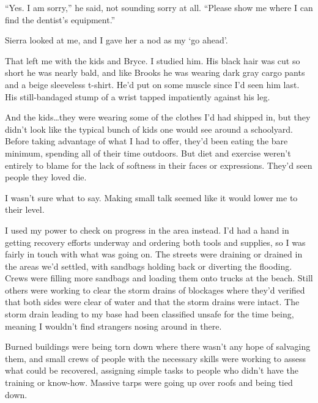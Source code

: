 ``Yes.  I am sorry,'' he said, not sounding sorry at all.  ``Please show me where I can find the dentist's equipment.''



Sierra looked at me, and I gave her a nod as my `go ahead'.



That left me with the kids and Bryce.  I studied him.  His black hair was cut so short he was nearly bald, and like Brooks he was wearing dark gray cargo pants and a beige sleeveless t-shirt.  He'd put on some muscle since I'd seen him last.  His still-bandaged stump of a wrist tapped impatiently against his leg.



And the kids\ldots they were wearing some of the clothes I'd had shipped in, but they didn't look like the typical bunch of kids one would see around a schoolyard.  Before taking advantage of what I had to offer, they'd been eating the bare minimum, spending all of their time outdoors.  But diet and exercise weren't entirely to blame for the lack of softness in their faces or expressions.  They'd seen people they loved die.



I wasn't sure what to say.  Making small talk seemed like it would lower me to their level.



I used my power to check on progress in the area instead.  I'd had a hand in getting recovery efforts underway and ordering both tools and supplies, so I was fairly in touch with what was going on.  The streets were draining or drained in the areas we'd settled, with sandbags holding back or diverting the flooding.  Crews were filling more sandbags and loading them onto trucks at the beach.  Still others were working to clear the storm drains of blockages where they'd verified that both sides were clear of water and that the storm drains were intact.  The storm drain leading to my base had been classified unsafe for the time being, meaning I wouldn't find strangers nosing around in there.



Burned buildings were being torn down where there wasn't any hope of salvaging them, and small crews of people with the necessary skills were working to assess what could be recovered, assigning simple tasks to people who didn't have the training or know-how.  Massive tarps were going up over roofs and being tied down.



